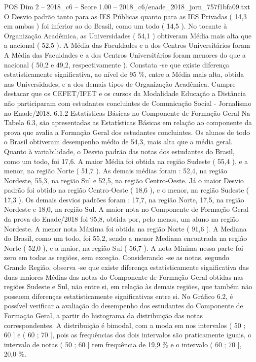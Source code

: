 \begin{textsample}{POS Dim 2 – 2018\_c6 – Score 1.00 – 2018\_c6/enade\_2018\_jorn\_757f1bfa09.txt}
O Desvio padrão tanto para as IES Públicas quanto para as IES Privadas ( 14,3 em ambas ) foi inferior ao do Brasil, como um todo ( 14,5 ).
No tocante à Organização Acadêmica, as Universidades ( 54,1 ) obtiveram Média mais alta que a nacional ( 52,5 ).
A Média das Faculdades e a dos Centros Universitários foram A Média das Faculdades e a dos Centros Universitários foram menores do que a nacional ( 50,2 e 49,2, respectivamente ).
Constata -se que existe diferença estatisticamente significativa, ao nível de 95 \%, entre a Média mais alta, obtida nas Universidades, e a dos demais tipos de Organização Acadêmica.
Cumpre destacar que os CEFET/IFET e os cursos da Modalidade Educação a Distância não participaram com estudantes concluintes de Comunicação Social - Jornalismo no Enade/2018. 6.1.2 Estatísticas Básicas no Componente de Formação Geral Na Tabela 6.3, são apresentadas as Estatísticas Básicas em relação ao componente da prova que avalia a Formação Geral dos estudantes concluintes.
Os alunos de todo o Brasil obtiveram desempenho médio de 54,3, mais alta que a média geral.
Quanto à variabilidade, o Desvio padrão das notas dos estudantes do Brasil, como um todo, foi 17,6.
A maior Média foi obtida na região Sudeste ( 55,4 ), e a menor, na região Norte ( 51,7 ).
As demais médias foram : 52,4, na região Nordeste, 55,3, na região Sul e 52,5, na região Centro-Oeste.
Já o maior Desvio padrão foi obtido na região Centro-Oeste ( 18,6 ), e o menor, na região Sudeste ( 17,3 ).
Os demais desvios padrões foram : 17,7, na região Norte, 17,5, na região Nordeste e 18,0, na região Sul.
A maior nota no Componente de Formação Geral da prova do Enade/2018 foi 95,8, obtida por, pelo menos, um aluno na região Nordeste.
A menor nota Máxima foi obtida na região Norte ( 91,6 ).
A Mediana do Brasil, como um todo, foi 55,2, sendo a menor Mediana encontrada na região Norte ( 52,0 ), e a maior, na região Sul ( 56,7 ).
A nota Mínima nessa parte foi zero em todas as regiões, sem exceção.
Considerando -se as notas, segundo Grande Região, observa -se que existe diferença estatisticamente significativa das duas maiores Médias das notas do Componente de Formação Geral obtidas nas regiões Sudeste e Sul, não entre si, em relação às demais regiões, que também não possuem diferenças estatisticamente significativas entre si.
No Gráfico 6.2, é possível verificar a avaliação do desempenho dos estudantes do Componente de Formação Geral, a partir do histograma da distribuição das notas correspondentes.
A distribuição é bimodal, com a moda em nos intervalos ( 50 ; 60 ] e ( 60 ; 70 ], pois as frequências dos dois intervalos são praticamente iguais, o intervalo de notas ( 50 ; 60 ] tem frequência de 19,9 \% e o intervalo ( 60 ; 70 ], 20,0 \%.

\end{textsample}
